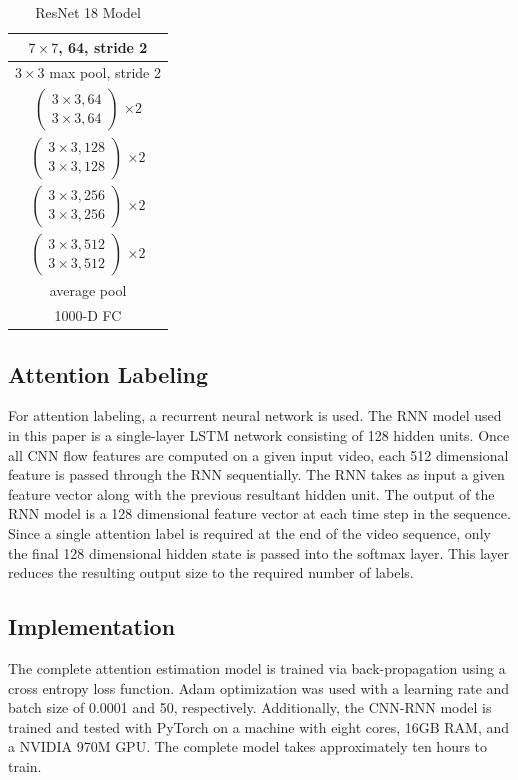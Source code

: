\documentclass[10pt, conference, compsocconf]{IEEEtran}
\begin{document}
\begin{table}[!t]
\renewcommand{\arraystretch}{1.3}
\caption{ResNet 18 Model}
\label{resnet18}
\centering
\begin{tabular}{|c|}
\hline
$7 \times 7$, 64, stride 2 \\
\hline
$3 \times 3$ max pool, stride 2\\
\hline
$
\begin{pmatrix}
3 \times 3, 64 \\
3 \times 3, 64
\end{pmatrix}
$
$ \times 2$ \\
\hline
$
\begin{pmatrix}
3 \times 3, 128 \\
3 \times 3, 128
\end{pmatrix}
$
$ \times 2$ \\
\hline
$
\begin{pmatrix}
3 \times 3, 256 \\
3 \times 3, 256
\end{pmatrix}
$
$ \times 2$ \\
\hline
$
\begin{pmatrix}
3 \times 3, 512 \\
3 \times 3, 512
\end{pmatrix}
$
$ \times 2$ \\
\hline
average pool \\
\hline
1000-D FC \\
\hline
\end{tabular}
\end{table}

\subsection{Attention Labeling}
For attention labeling, a recurrent neural network is used. The RNN model used in this paper is a single-layer LSTM network consisting of 128 hidden units. Once all CNN flow features are computed on a given input video, each 512 dimensional feature is passed through the RNN sequentially. The RNN takes as input a given feature vector along with the previous resultant hidden unit. The output of the RNN model is a 128 dimensional feature vector at each time step in the sequence. Since a single attention label is required at the end of the video sequence, only the final 128 dimensional hidden state is passed into the softmax layer. This layer reduces the resulting output size to the required number of labels.

\subsection{Implementation}
The complete attention estimation model is trained via back-propagation using a cross entropy loss function. Adam optimization \cite{DBLP:journals/corr/KingmaB14} was used with a learning rate and batch size of 0.0001 and 50, respectively. Additionally, the CNN-RNN model is trained and tested with PyTorch \cite{paszke2017automatic} on a machine with eight cores, 16GB RAM, and a NVIDIA 970M GPU. The complete model takes approximately ten hours to train.
\end{document}
